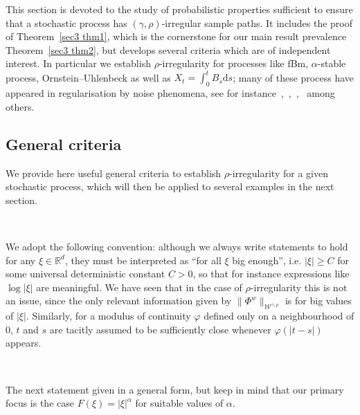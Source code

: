 \documentclass[10pt]{article}
\newcommand{\mathd}{\mathrm{d}}
\begin{document}
This section is devoted to the study of probabilistic properties sufficient to
ensure that a stochastic process has $(\gamma, \rho)$\mbox{-}irregular sample
paths. It includes the proof of Theorem~\ref{sec3 thm1}, which is the
cornerstone for our main result prevalence Theorem~\ref{sec3 thm2}, but
develops several criteria which are of independent interest. In particular we
establish $\rho$\mbox{-}irregularity for processes like fBm,
$\alpha$\mbox{-}stable process, Ornstein--Uhlenbeck as well as $X_t = \int_0^t
B_s \mathd s$; many of these process have appeared in regularisation by noise
phenomena, see for
instance~{\cite{le}},~{\cite{athreya}},~{\cite{priola2020}},~{\cite{chaudru}}
among others.

\subsection{General criteria}\label{sec4.1}

We provide here useful general criteria to establish
$\rho$\mbox{-}irregularity for a given stochastic process, which will then be
applied to several examples in the next section.

\

We adopt the following convention: although we always write statements to
hold for any $\xi \in \mathbb{R}^d$, they must be interpreted as ``for all
$\xi$ big enough'', i.e. $| \xi | \geqslant C$ for some universal
deterministic constant $C > 0$, so that for instance expressions like $\log |
\xi |$ are meaningful. We have seen that in the case of
$\rho$\mbox{-}irregularity this is not an issue, since the only relevant
information given by $\| \Phi^w \|_{\mathcal{W}^{\gamma, \rho}}$ is for big
values of $| \xi |$. Similarly, for a modulus of continuity $\varphi$ defined
only on a neighbourhood of $0$, $t$ and $s$ are tacitly assumed to be
sufficiently close whenever $\varphi (| t - s |)$ appears.

\

The next statement given in a general form, but keep in mind that our primary
focus is the case $F (\xi) = | \xi |^{\alpha}$ for suitable values of
$\alpha$.
\end{document}
